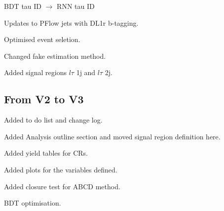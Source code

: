 BDT tau ID $\to$ RNN tau ID

Updates to PFlow jets with DL1r b-tagging.

Optimised event seletion.

Changed fake estimation method.

Added signal regions $l\tau$ 1j and $l\tau$ 2j.

\subsection{From V2 to V3}

Added to do list and change log.

Added Analysis outline section and moved signal region definition here.

Added yield tables for CRs.

Added plots for the variables defined.

Added closure test for ABCD method.

BDT optimisation.